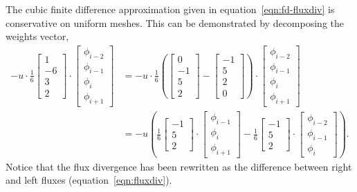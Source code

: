 \documentclass{article}
\begin{document}
The cubic finite difference approximation given in equation~\eqref{eqn:fd-fluxdiv} is conservative on uniform meshes.  This can be demonstrated by decomposing the weights vector,
\begin{align}
	-u \cdot \frac{1}{6}
	\begin{bmatrix}
		1 \\ -6 \\ 3 \\ 2
	\end{bmatrix}
	\cdot
	\begin{bmatrix}
		\phi_{i-2} \\
		\phi_{i-1} \\
		\phi_i \\
		\phi_{i+1}
	\end{bmatrix}
	&= 
	-u \cdot
	\frac{1}{6}
	\left(
	\begin{bmatrix}
		0 \\ -1 \\ 5 \\ 2
	\end{bmatrix}
	-
	\begin{bmatrix}
		-1 \\ 5 \\ 2 \\ 0
	\end{bmatrix}
	\right)
	\cdot
	\begin{bmatrix}
		\phi_{i-2} \\
		\phi_{i-1} \\
		\phi_i \\
		\phi_{i+1}
	\end{bmatrix} \\
	&=
	-u \left(
	\frac{1}{6}
	\begin{bmatrix}
		-1 \\ 5 \\ 2
	\end{bmatrix}
	\cdot
	\begin{bmatrix}
		\phi_{i-1} \\
		\phi_i \\
		\phi_{i+1}
	\end{bmatrix}
	-
	\frac{1}{6}
	\begin{bmatrix}
		-1 \\ 5 \\ 2
	\end{bmatrix}
	\cdot
	\begin{bmatrix}
		\phi_{i-2} \\
		\phi_{i-1} \\
		\phi_i
	\end{bmatrix} \right) \text{.}
\end{align}
Notice that the flux divergence has been rewritten as the difference between right and left fluxes (equation~\ref{eqn:fluxdiv}).
\end{document}
